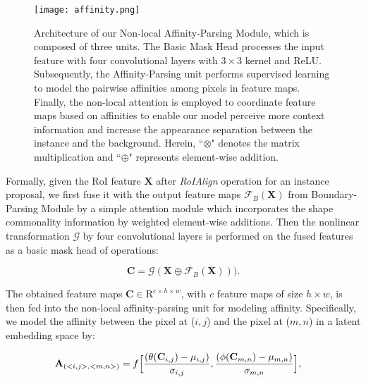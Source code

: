 \documentclass[runningheads]{llncs}
\begin{document}
\begin{figure}[t]
\centering
\texttt{[image: affinity.png]}
\vspace{-0.15in}
\caption{Architecture of our Non-local Affinity-Parsing Module, which is composed of three units. The Basic Mask Head processes the input feature with four convolutional layers with $3 \times 3$ kernel and ReLU. Subsequently, the Affinity-Parsing unit performs supervised learning to model the pairwise affinities among pixels in feature maps. Finally, the non-local attention is employed to coordinate feature maps based on affinities to enable our model perceive more context information and increase the appearance separation between the instance and the background. Herein, ``$\otimes$" denotes the matrix multiplication and ``$\oplus$" represents element-wise addition.}
\label{fig:affinity}
\vspace{-0.25in}
\end{figure}

Formally, given the RoI feature $\mathbf{X}$ after \emph{RoIAlign} operation for an instance proposal, we first fuse it with the output feature maps $\mathcal{F}_B(\mathbf{X})$ from Boundary-Parsing Module by a simple attention module which incorporates the shape commonality information by weighted element-wise additions. Then the nonlinear transformation $\mathcal{G}$ by four convolutional layers is performed on the fused features as a basic mask head of operations:
\begin{small}
\begin{equation}
    \mathbf{C} = \mathcal{G}(\mathbf{X} \oplus \mathcal{F}_B(\mathbf{X}))).
\end{equation}
\end{small}

\vspace{-3mm}\noindent
The obtained feature maps $\mathbf{C} \in\mathrm{R}^{c\times h \times w}$, with $c$ feature maps of size $h\times w$, is then fed into the non-local affinity-parsing unit for modeling affinity. 
Specifically, we model the affinity between the pixel at ($i, j$) and the pixel at ($m, n$) in a latent embedding space by:
\begin{small}
\begin{align}
\vspace{-3mm}
\begin{split}
    & \mathbf{A}_{(<i,j>, <m,n>)} = f\Big [\frac{(\theta(\mathbf{C}_{i,j})-\mu_{i,j})}{\sigma_{i,j}}, \frac{(\phi(\mathbf{C}_{m,n})-\mu_{m,n})}{\sigma_{m,n}}
    \Big ],
\end{split}
\end{align}
\end{small}
\end{document}
